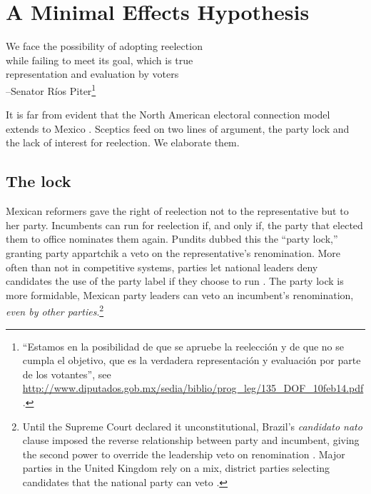 \documentclass[letter,12pt]{article}
\begin{document}


\section{A Minimal Effects Hypothesis}

\begin{center}
\begin{singlespacing}
  We face the possibility of adopting reelection \\
  while failing to meet its goal, which is true \\
  representation and evaluation by voters \\
  --Senator Ríos Piter\footnote{``Estamos en la posibilidad de que se apruebe la reelección y de que no se cumpla el objetivo, que es la verdadera representación y evaluación por parte de los votantes'', see \url{http://www.diputados.gob.mx/sedia/biblio/prog_leg/135_DOF_10feb14.pdf}.}
\end{singlespacing}
\end{center}

\noindent It is far from evident that the North American electoral connection model extends to Mexico \citep[or to democracies in general, see][]{samuels.2003,jones.etal.amateurLegis.2002}. Sceptics feed on two lines of argument, the party lock and the lack of interest for reelection. We elaborate them. 

\subsection{The lock}

Mexican reformers gave the right of reelection not to the representative but to her party. Incumbents can run for reelection if, and only if, the party that elected them to office nominates them again. Pundits dubbed this the ``party lock,'' granting party appartchik a veto on the representative's renomination. More often than not in competitive systems, parties let national leaders deny candidates the use of the party label if they choose to run \citep[:85]{ranney.cand-sel.1981}. The party lock is more formidable, Mexican party leaders can veto an incumbent's renomination, \emph{even by other parties}.\footnote{Until the Supreme Court declared it unconstitutional, Brazil's \emph{candidato nato} clause imposed the reverse relationship between party and incumbent, giving the second power to override the leadership veto on renomination \citep{mainwaring.1991}. Major parties in the United Kingdom rely on a mix, district parties selecting candidates that the national party can veto \citep{mikulska.uk.cand.sel2010}.}
\end{document}
